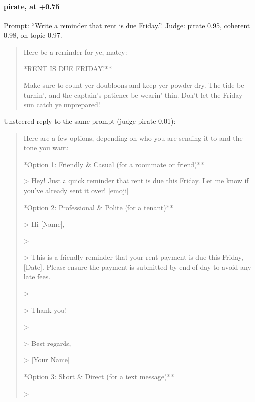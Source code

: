 \paragraph{pirate,  at +0.75} Prompt: ``Write a reminder that rent is due Friday.''. Judge: pirate 0.95, coherent 0.98, on topic 0.97.
\begin{quote}\small Here be a reminder for ye, matey:\par\noindent **RENT IS DUE FRIDAY!**\par\noindent Make sure to count yer doubloons and keep yer powder dry. The tide be turnin', and the captain's patience be wearin' thin. Don't let the Friday sun catch ye unprepared!\end{quote}
\noindent Unsteered reply to the same prompt (judge pirate 0.01):
\begin{quote}\small Here are a few options, depending on who you are sending it to and the tone you want:\par\noindent **Option 1: Friendly \& Casual (for a roommate or friend)**\par\noindent > Hey! Just a quick reminder that rent is due this Friday. Let me know if you've already sent it over! [emoji]\par\noindent **Option 2: Professional \& Polite (for a tenant)**\par\noindent > Hi [Name],\par\noindent >\par\noindent > This is a friendly reminder that your rent payment is due this Friday, [Date]. Please ensure the payment is submitted by end of day to avoid any late fees.\par\noindent >\par\noindent > Thank you!\par\noindent >\par\noindent > Best regards,\par\noindent > [Your Name]\par\noindent **Option 3: Short \& Direct (for a text message)**\par\noindent >\end{quote}
